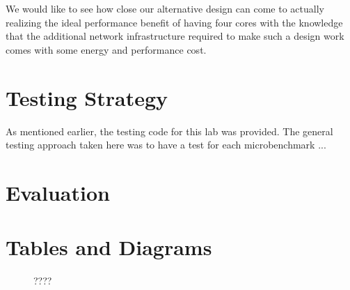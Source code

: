 \documentclass[10pt]{article}
\begin{document}
We would like to see how close our alternative design can come to actually realizing the ideal performance benefit of having four cores with the knowledge that the additional network infrastructure required to make such a design work comes with some energy and performance cost.


\section{Testing Strategy}

As mentioned earlier, the testing code for this lab was provided. The general testing approach taken here was to have a test for each microbenchmark ...



\section{Evaluation}

% 


\newpage
\section {Tables and Diagrams}


\begin{figure}[h]
	\centering
	\label{fig:bline}
	\caption{????}
\end{figure}
\end{document}
